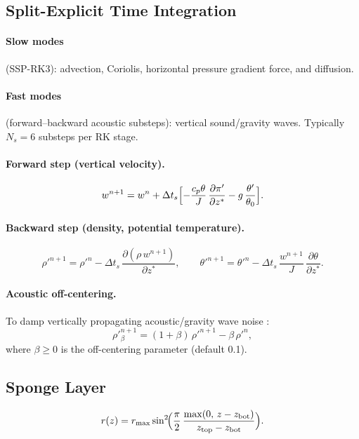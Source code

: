 \documentclass[11pt,twoside]{report}
\newcommand{\pp}{\partial}
\newcommand{\cpd}{c_p}
\begin{document}
\subsection{Split-Explicit Time Integration}

\paragraph{Slow modes} (SSP-RK3): advection, Coriolis, horizontal pressure
gradient force, and diffusion.

\paragraph{Fast modes} (forward--backward acoustic substeps):
vertical sound/gravity waves.  Typically $N_s=6$ substeps per RK stage.

\paragraph{Forward step (vertical velocity).}
\begin{equation}
  w^{n+1} = w^n + \Delta t_s
  \Bigl[-\frac{\cpd\theta}{J}\,\frac{\pp\pi'}{\pp z^*}
  - g\,\frac{\theta'}{\theta_0}\Bigr].
\end{equation}

\paragraph{Backward step (density, potential temperature).}
\begin{equation}
  \rho'^{n+1} = \rho'^n
  - \Delta t_s\,\frac{\pp(\rho\,w^{n+1})}{\pp z^*},
  \qquad
  \theta'^{n+1} = \theta'^n
  - \Delta t_s\,\frac{w^{n+1}}{J}\,\frac{\pp\theta}{\pp z^*}.
\end{equation}

\paragraph{Acoustic off-centering.}
To damp vertically propagating acoustic/gravity wave noise
\citep{SkamarockKlemp2008}:
\begin{equation}
  \rho'^{n+1}_{\beta} = (1+\beta)\,\rho'^{n+1} - \beta\,\rho'^{n},
\end{equation}
where $\beta\ge 0$ is the off-centering parameter (default 0.1).

\subsection{Sponge Layer}
\begin{equation}
  r(z) = r_{\max}\sin^2\!\Bigl(\frac{\pi}{2}\,
  \frac{\max(0,\,z-z_{\mathrm{bot}})}{z_{\mathrm{top}}-z_{\mathrm{bot}}}\Bigr).
\end{equation}
\end{document}
